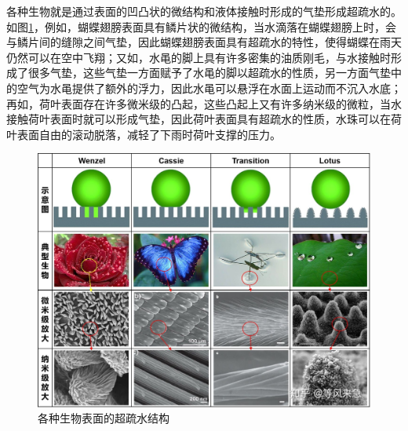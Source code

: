 \documentclass{assignment}
\begin{document}
\begin{da}
    各种生物就是通过表面的凹凸状的微结构和液体接触时形成的气垫形成超疏水的。如图\ref{Super-hydrophobic}，例如，蝴蝶翅膀表面具有鳞片状的微结构，当水滴落在蝴蝶翅膀上时，会与鳞片间的缝隙之间气垫，因此蝴蝶翅膀表面具有超疏水的特性，使得蝴蝶在雨天仍然可以在空中飞翔；又如，水黾的脚上具有许多密集的油质刚毛，与水接触时形成了很多气垫，这些气垫一方面赋予了水黾的脚以超疏水的性质，另一方面气垫中的空气为水黾提供了额外的浮力，因此水黾可以悬浮在水面上运动而不沉入水底；再如，荷叶表面存在许多微米级的凸起，这些凸起上又有许多纳米级的微粒，当水接触荷叶表面时就可以形成气垫，因此荷叶表面具有超疏水的性质，水珠可以在荷叶表面自由的滚动脱落，减轻了下雨时荷叶支撑的压力。
    \begin{figure}[H]
        \centering
        \includegraphics[width=.5\columnwidth]{Super-hydrophobic.jpg}
        \caption{各种生物表面的超疏水结构}
        \label{Super-hydrophobic}
    \end{figure}
\end{da}
\end{document}
